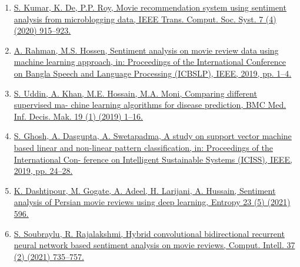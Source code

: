 \documentclass[
]{article}
\begin{document}
\begin{enumerate}
{  Adv. Technol. (IJEAT) 9 (5) (2020) 2--3 ISSN: 2249
  --8958VolumeIssueJune.}
\item
  \href{http://refhub.elsevier.com/S2666-285X(22)00017-6/sbref0019}{S.
  Kumar, K. De, P.P. Roy, Movie recommendation system using sentiment
  analysis from microblogging data, IEEE Trans. Comput. Soc. Syst. 7 (4)
  (2020) 915--923.}
\item
  \href{http://refhub.elsevier.com/S2666-285X(22)00017-6/sbref0020}{A.
  Rahman, M.S. Hossen, Sentiment analysis on movie review data using
  machine learning approach, in: Proceedings of the International
  Conference on Bangla Speech and Language Processing (ICBSLP), IEEE,
  2019, pp. 1--4.}
\item
  \href{http://refhub.elsevier.com/S2666-285X(22)00017-6/sbref0021}{S.
  Uddin, A. Khan, M.E. Hossain, M.A. Moni, Comparing diﬀerent supervised
  ma- chine learning algorithms for disease prediction, BMC Med. Inf.
  Decis. Mak. 19 (1) (2019) 1--16.}
\item
  \href{http://refhub.elsevier.com/S2666-285X(22)00017-6/sbref0022}{S.
  Ghosh, A. Dasgupta, A. Swetapadma, A study on support vector machine
  based linear and non-linear pattern classiﬁcation, in: Proceedings of
  the International Con- ference on Intelligent Sustainable Systems
  (ICISS), IEEE, 2019, pp. 24--28.}
\item
  \href{http://refhub.elsevier.com/S2666-285X(22)00017-6/sbref0023}{K.
  Dashtipour, M. Gogate, A. Adeel, H. Larijani, A. Hussain, Sentiment
  analysis of Persian movie reviews using deep learning, Entropy 23 (5)
  (2021) 596.}
\item
  \href{http://refhub.elsevier.com/S2666-285X(22)00017-6/sbref0024}{S.
  Soubraylu, R. Rajalakshmi, Hybrid convolutional bidirectional
  recurrent neural network based sentiment analysis on movie reviews,
  Comput. Intell. 37 (2) (2021) 735--757.}
\end{enumerate}
\end{document}
